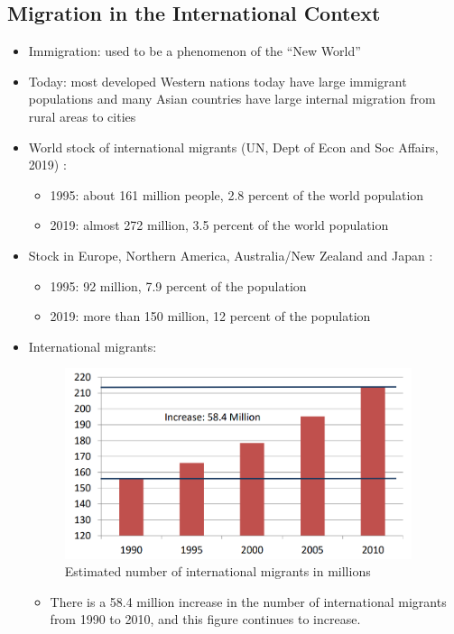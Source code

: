 \subsection{Migration in the International Context}
\begin{itemize}
    \item Immigration: used to be a phenomenon of the “New World”
    \item Today: most developed Western nations today have large immigrant populations and many Asian countries have large internal migration from rural areas to cities
    \item World stock of international migrants (UN, Dept of Econ and Soc Affairs, 2019) :
         \begin{itemize}
         \item 1995: about 161 million people, 2.8 percent of the world population
         \item 2019: almost 272 million, 3.5 percent of the world population
         \end{itemize}
    \item Stock in Europe, Northern America, Australia/New Zealand and Japan :
         \begin{itemize}
         \item 1995: 92 million, 7.9 percent of the population
         \item 2019: more than 150 million, 12 percent of the population
         \end{itemize}
    \item International migrants:
    \begin{figure}[H]
                \centering
                \includegraphics[width=4in]{images/ch11/1.png}
                \caption{Estimated number of international migrants in millions}
            \end{figure}
         \begin{itemize}
         \item There is a 58.4 million increase in the number of international migrants from 1990 to 2010, and this figure continues to increase.

\end{itemize}
\end{itemize}
